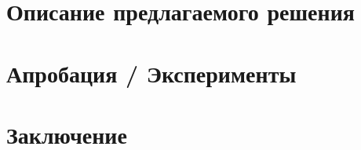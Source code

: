 \documentclass[a4paper]{article}
\begin{document}
\section{Описание предлагаемого решения}




\section{Апробация / Эксперименты}





\section{Заключение}


\end{document}
